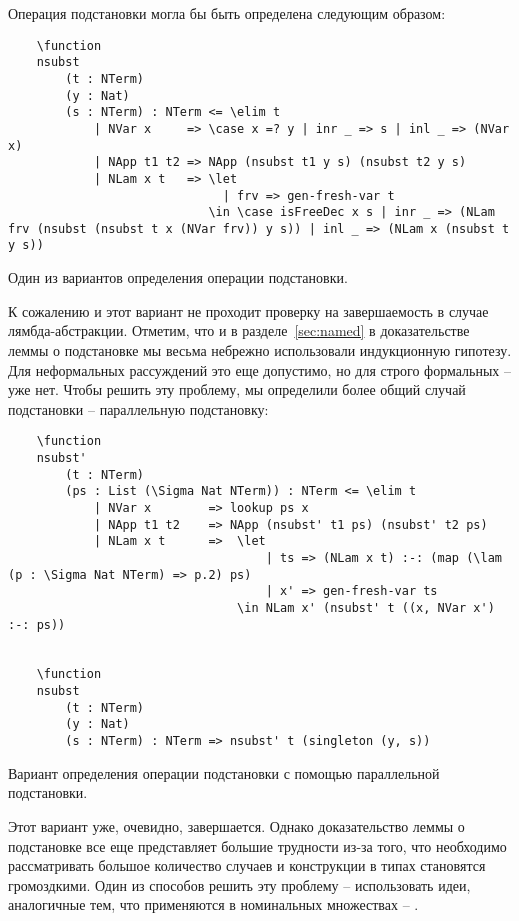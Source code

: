 Операция подстановки могла бы быть определена следующим образом:
\begin{listing}[H]
  \begin{verbatim}
    \function
    nsubst
        (t : NTerm)
        (y : Nat)
        (s : NTerm) : NTerm <= \elim t
            | NVar x     => \case x =? y | inr _ => s | inl _ => (NVar x)
            | NApp t1 t2 => NApp (nsubst t1 y s) (nsubst t2 y s)
            | NLam x t   => \let
                              | frv => gen-fresh-var t
                            \in \case isFreeDec x s | inr _ => (NLam frv (nsubst (nsubst t x (NVar frv)) y s)) | inl _ => (NLam x (nsubst t y s))
  \end{verbatim}
  \caption{Один из вариантов определения операции подстановки.}
\end{listing}

К сожалению и этот вариант не проходит проверку на завершаемость в случае лямбда-абстракции. Отметим, что и в разделе~\ref{sec:named} в доказательстве леммы о подстановке мы весьма небрежно использовали индукционную гипотезу. Для неформальных рассуждений это еще допустимо, но для строго формальных -- уже нет. Чтобы решить эту проблему, мы определили более общий случай подстановки -- параллельную подстановку:

\begin{listing}[H]
  \begin{verbatim}
    \function
    nsubst'
        (t : NTerm)
        (ps : List (\Sigma Nat NTerm)) : NTerm <= \elim t
            | NVar x        => lookup ps x
            | NApp t1 t2    => NApp (nsubst' t1 ps) (nsubst' t2 ps)
            | NLam x t      =>  \let
                                    | ts => (NLam x t) :-: (map (\lam (p : \Sigma Nat NTerm) => p.2) ps)
                                    | x' => gen-fresh-var ts
                                \in NLam x' (nsubst' t ((x, NVar x') :-: ps))


    \function
    nsubst
        (t : NTerm)
        (y : Nat)
        (s : NTerm) : NTerm => nsubst' t (singleton (y, s))
  \end{verbatim}
  \caption{Вариант определения операции подстановки с помощью параллельной подстановки.}
\end{listing}

Этот вариант уже, очевидно, завершается. Однако доказательство леммы о подстановке все еще представляет большие трудности из-за того, что необходимо рассматривать большое количество случаев и конструкции в типах становятся громоздкими. Один из способов решить эту проблему -- использовать идеи, аналогичные тем, что применяются в номинальных множествах -- \cite{pitts2013nominal}.


